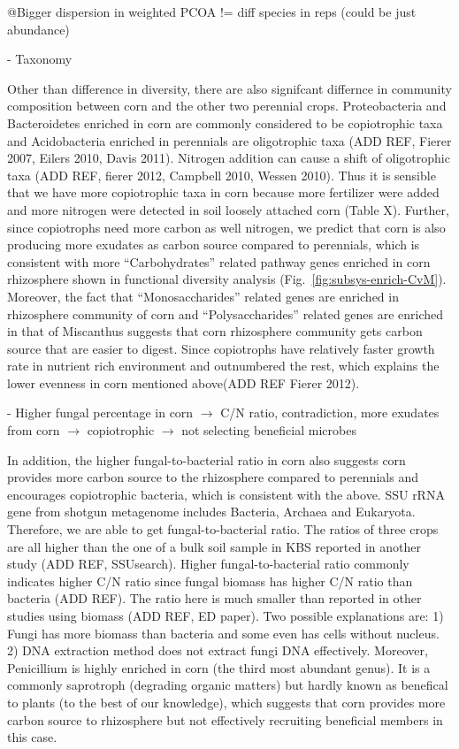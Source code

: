 \documentclass[12pt]{article}
\begin{document}
@Bigger dispersion in weighted PCOA != diff species in reps (could be just abundance)

- Taxonomy

Other than difference in diversity, there are also signifcant differnce in community composition between corn and the other two perennial crops. Proteobacteria and Bacteroidetes enriched in corn are commonly considered to be copiotrophic taxa and Acidobacteria enriched in perennials are oligotrophic taxa (ADD REF, Fierer 2007, Eilers 2010, Davis 2011). Nitrogen addition can cause a shift of oligotrophic taxa (ADD REF, fierer 2012, Campbell 2010, Wessen 2010). Thus it is sensible that we have more copiotrophic taxa in corn because more fertilizer were added and more nitrogen were detected in soil loosely attached corn (Table X). Further, since copiotrophs need more carbon as well nitrogen, we predict that corn is also producing more exudates as carbon source compared to perennials, which is consistent with more ``Carbohydrates'' related pathway genes enriched in corn rhizosphere shown in functional diversity analysis (Fig.~\ref{fig:subsys-enrich-CvM}). Moreover, the fact that ``Monosaccharides'' related genes are enriched in rhizosphere community of corn and ``Polysaccharides'' related genes are enriched in that of Miscanthus suggests that corn rhizosphere community gets carbon source that are easier to digest. Since copiotrophs have relatively faster growth rate in nutrient rich environment and outnumbered the rest, which explains the lower evenness in corn mentioned above(ADD REF Fierer 2012).

- Higher fungal percentage in corn $\rightarrow$ C/N ratio, contradiction, more exudates from corn $\rightarrow$ copiotrophic $\rightarrow$ not selecting beneficial microbes

In addition, the higher fungal-to-bacterial ratio in corn also suggests corn provides more carbon source to the rhizosphere compared to perennials and encourages copiotrophic bacteria, which is consistent with the above. SSU rRNA gene from shotgun metagenome includes Bacteria, Archaea and Eukaryota. Therefore, we are able to get fungal-to-bacterial ratio. The ratios of three crops are all higher than the one of a bulk soil sample in KBS reported in another study (ADD REF, SSUsearch). Higher fungal-to-bacterial ratio commonly indicates higher C/N ratio since fungal biomass has higher C/N ratio than bacteria (ADD REF). The ratio here is much smaller than reported in other studies using biomass (ADD REF, ED paper). Two possible explanations are: 1) Fungi has more biomass than bacteria and some even has cells without nucleus. 2) DNA extraction method does not extract fungi DNA effectively. Moreover, Penicillium is highly enriched in corn (the third most abundant genus). It is a commonly saprotroph (degrading organic matters) but hardly known as benefical to plants (to the best of our knowledge), which suggests that corn provides more carbon source to rhizosphere but not effectively recruiting beneficial members in this case.
\end{document}
